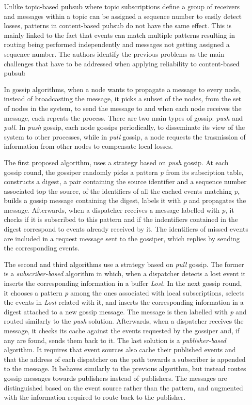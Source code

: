 Unlike topic-based \gls{pubsub} where topic subscriptions define a group of receivers and messages within a topic can be assigned a sequence number to easily detect losses, patterns in content-based \gls{pubsub} do not have the same effect. This is mainly linked to the fact that events can match multiple patterns resulting in routing being performed independently and messages not getting assigned a sequence number. The authors identify the previous problems as the main challenges that have to be addressed when applying reliability to content-based \gls{pubsub}

In gossip algorithms, when a node wants to propagate a message to every node, instead of broadcasting the message, it picks a subset of the nodes, from the set of nodes in the system, to send the message to and when each node receives the message, each repeats the process. There are two main types of gossip: \textit{push} and \textit{pull}. In \textit{push} gossip, each node gossips periodically, to disseminate its view of the system to other processes, while in \textit{pull} gossip, a node requests the trasmission of information from other nodes to compensate local losses.

The first proposed algorithm, uses a strategy based on \textit{push} gossip. At each gossip round, the gossiper randomly picks a pattern \textit{p} from its subsciption table, constructs a digest, a pair containing the source identifier and a sequence number associated top the source, of the identifiers of all the cached events matching \textit{p}, builds a gossip message containing the digest, labels it with \textit{p} and propagates the message. Afterwards, when a dispatcher receives a message labelled with \textit{p}, it checks if it is subscribed to this pattern and if the indentifiers contained in the digest correspond to events already received by it. The identifiers of missed events are included in a request message sent to the gossiper, which replies by sending the corresponding events.

The second and third algorithms use a strategy based on \textit{pull} gossip. The former is a \textit{subscriber-based} algorithm in which, when a dispatcher detects a lost event it inserts the corresponding information in a buffer \textit{Lost}. In the next gossip round, it chooses a pattern \textit{p} among the ones associated with local subscriptions, selects the events in \textit{Lost} related with it, and inserts the corresponding information in a digest attached to a new gossip message. The message is then labelled with \textit{p} and routed similarly to the \textit{push} solution. Afterwards, when a dispatcher receives the message, it checks its  cache against the events requested by the gossiper and, if any are found, sends them back to it. The last solution is a \textit{publisher-based} algorithm. It requires that event sources also cache their published events and that the address of each dispatcher on the path towards a subscriber is appended to the message. It behaves similarly to the previous algorithm, but instead routes gossip messages towards publishers instead of publishers. The messages are distinguished based on the event source rather than the pattern, and augmented with the information required to route back to the publisher.

